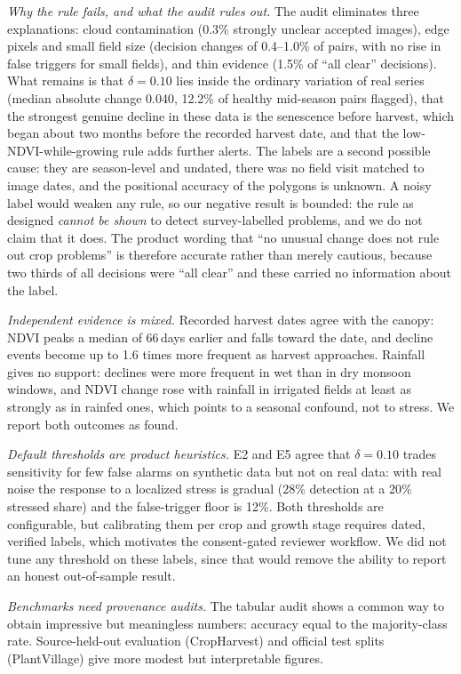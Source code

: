 \documentclass[conference]{IEEEtran}
\begin{document}
\textit{Why the rule fails, and what the audit rules out.} The audit eliminates three explanations: cloud contamination (0.3\% strongly unclear accepted images), edge pixels and small field size (decision changes of 0.4--1.0\% of pairs, with no rise in false triggers for small fields), and thin evidence (1.5\% of ``all clear'' decisions). What remains is that $\delta=0.10$ lies inside the ordinary variation of real series (median absolute change 0.040, 12.2\% of healthy mid-season pairs flagged), that the strongest genuine decline in these data is the senescence before harvest, which began about two months before the recorded harvest date, and that the low-NDVI-while-growing rule adds further alerts. The labels are a second possible cause: they are season-level and undated, there was no field visit matched to image dates, and the positional accuracy of the polygons is unknown. A noisy label would weaken any rule, so our negative result is bounded: the rule as designed \emph{cannot be shown} to detect survey-labelled problems, and we do not claim that it does. The product wording that ``no unusual change does not rule out crop problems'' is therefore accurate rather than merely cautious, because two thirds of all decisions were ``all clear'' and these carried no information about the label.

\textit{Independent evidence is mixed.} Recorded harvest dates agree with the canopy: NDVI peaks a median of 66\,days earlier and falls toward the date, and decline events become up to 1.6 times more frequent as harvest approaches. Rainfall gives no support: declines were more frequent in wet than in dry monsoon windows, and NDVI change rose with rainfall in irrigated fields at least as strongly as in rainfed ones, which points to a seasonal confound, not to stress. We report both outcomes as found.

\textit{Default thresholds are product heuristics.} E2 and E5 agree that $\delta=0.10$ trades sensitivity for few false alarms on synthetic data but not on real data: with real noise the response to a localized stress is gradual (28\% detection at a 20\% stressed share) and the false-trigger floor is 12\%. Both thresholds are configurable, but calibrating them per crop and growth stage requires dated, verified labels, which motivates the consent-gated reviewer workflow. We did not tune any threshold on these labels, since that would remove the ability to report an honest out-of-sample result.

\textit{Benchmarks need provenance audits.} The tabular audit shows a common way to obtain impressive but meaningless numbers: accuracy equal to the majority-class rate. Source-held-out evaluation (CropHarvest) and official test splits (PlantVillage) give more modest but interpretable figures.
\end{document}
